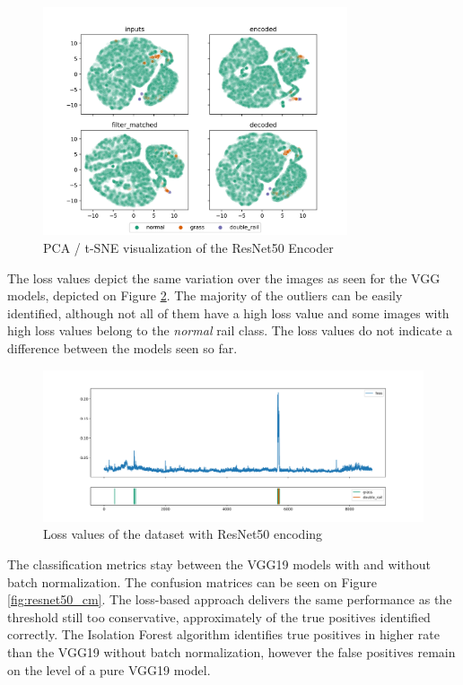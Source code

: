 \begin{figure}[H]
    \centering
    \includegraphics[width=0.8\textwidth,trim={0 0 0 1cm},clip]{./results/resnet50_vgg19/20230514_213740_feature_vectors_1.png}
    \caption{PCA / t-SNE visualization of the ResNet50 Encoder}
    \label{fig:resnet50_pca}
\end{figure}

The loss values depict the same variation over the images as seen for the VGG models,
depicted on Figure \ref{fig:resnet50_loss}.
The majority of the outliers can be easily identified, although not all of them have a high loss value
and some images with high loss values belong to the \emph{normal} rail class.
The loss values do not indicate a difference between the models seen so far.

\begin{figure}[H]
    \centering
    \includegraphics[width=\textwidth,trim={0 1cm 0 1cm},clip]{./results/resnet50_vgg19/20230514_213740_feature_vectors_loss.png}
    \caption{Loss values of the dataset with ResNet50 encoding}
    \label{fig:resnet50_loss}
\end{figure}

The classification metrics stay between the VGG19 models with and without batch normalization.
The confusion matrices can be seen on Figure \ref{fig:resnet50_cm}.
The loss-based approach delivers the same performance as the threshold still too conservative,
approximately \small {} of the true positives identified correctly.
The Isolation Forest algorithm identifies true positives in higher rate than the VGG19 without
batch normalization, however the false positives remain on the level of a pure VGG19 model.

